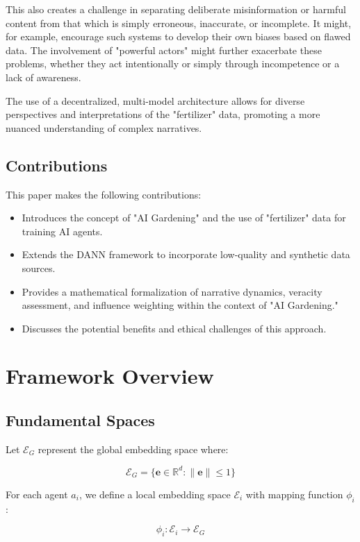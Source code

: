 \documentclass[12pt, a4paper]{article}
\begin{document}
This also creates a challenge in separating deliberate misinformation or harmful content from that which is simply erroneous, inaccurate, or incomplete. It might, for example, encourage such systems to develop their own biases based on flawed data. The involvement of "powerful actors" might further exacerbate these problems, whether they act intentionally or simply through incompetence or a lack of awareness.

The use of a decentralized, multi-model architecture allows for diverse perspectives and interpretations of the "fertilizer" data, promoting a more nuanced understanding of complex narratives.

\subsection{Contributions}
This paper makes the following contributions:
\begin{itemize}
    \item Introduces the concept of "AI Gardening" and the use of "fertilizer" data for training AI agents.
    \item Extends the DANN framework to incorporate low-quality and synthetic data sources.
    \item Provides a mathematical formalization of narrative dynamics, veracity assessment, and influence weighting within the context of "AI Gardening."
    \item Discusses the potential benefits and ethical challenges of this approach.
\end{itemize}

\section{Framework Overview}
\subsection{Fundamental Spaces}
Let $\mathcal{E}_G$ represent the global embedding space where:

\begin{equation}
\mathcal{E}_G = \{\mathbf{e} \in \mathbb{R}^d : \|\mathbf{e}\| \leq 1\}
\end{equation}

For each agent $a_i$, we define a local embedding space $\mathcal{E}_i$ with mapping function $\phi_i$:

\begin{equation}
\phi_i: \mathcal{E}_i \rightarrow \mathcal{E}_G
\end{equation}
\end{document}

